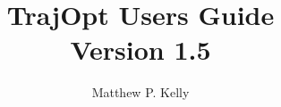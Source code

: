 \documentclass[onecolumn]{article}
\title{TrajOpt Users Guide  \\  Version 1.5}
\author{Matthew P. Kelly}
\begin{document}
\maketitle





\pagebreak
 

\end{document}
